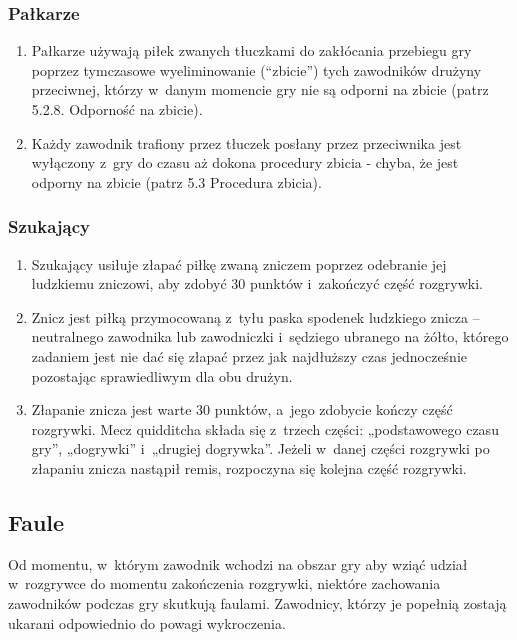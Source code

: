 \documentclass[12pt]{article}
\begin{document}
\subsubsection{Pałkarze}
\begin{enumerate}
	\item Pałkarze używają piłek zwanych tłuczkami do zakłócania przebiegu gry
	      poprzez tymczasowe wyeliminowanie (``zbicie'') tych zawodników drużyny
	      przeciwnej, którzy w~danym momencie gry nie są odporni na zbicie (patrz
	      5.2.8. Odporność na zbicie).

	\item Każdy zawodnik trafiony przez tłuczek posłany przez przeciwnika jest
	      wyłączony z~gry do czasu aż dokona procedury zbicia - chyba, że jest
	      odporny na zbicie (patrz 5.3 Procedura zbicia).
\end{enumerate}

\subsubsection{Szukający}
\begin{enumerate}
	\item Szukający usiłuje złapać piłkę zwaną zniczem poprzez odebranie jej
	      ludzkiemu zniczowi, aby zdobyć 30 punktów i~zakończyć część rozgrywki.

	\item Znicz jest piłką przymocowaną z~tyłu paska spodenek ludzkiego znicza
	      -- neutralnego zawodnika lub zawodniczki i~sędziego ubranego na żółto,
	      którego zadaniem jest nie dać się złapać przez jak najdłuższy czas
	      jednocześnie pozostając sprawiedliwym dla obu drużyn.

	\item Złapanie znicza jest warte 30 punktów, a~jego zdobycie kończy część
	      rozgrywki. Mecz quidditcha składa się z~trzech części: „podstawowego
	      czasu gry'', „dogrywki'' i~„drugiej dogrywka''. Jeżeli w~danej części
	      rozgrywki po złapaniu znicza nastąpił remis, rozpoczyna się kolejna
	      część rozgrywki.
\end{enumerate}

\subsection{Faule}
Od momentu, w~którym zawodnik wchodzi na obszar gry aby wziąć udział w~rozgrywce do momentu zakończenia rozgrywki, niektóre zachowania
zawodników podczas gry skutkują faulami. Zawodnicy, którzy je popełnią
zostają ukarani odpowiednio do powagi wykroczenia.
\end{document}
